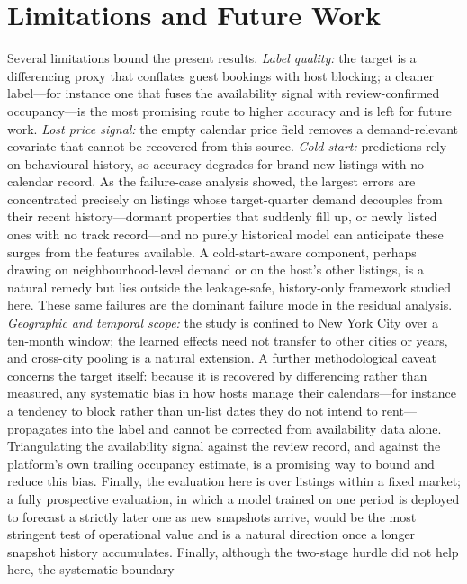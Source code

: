 \documentclass[journal]{IEEEtran}
\begin{document}
\section{Limitations and Future Work}
\label{sec:limits}
Several limitations bound the present results. \emph{Label quality:} the target is
a differencing proxy that conflates guest bookings with host blocking; a cleaner
label---for instance one that fuses the availability signal with review-confirmed
occupancy---is the most promising route to higher accuracy and is left for future
work. \emph{Lost price signal:} the empty calendar price field removes a
demand-relevant covariate that cannot be recovered from this source.
\emph{Cold start:} predictions rely on behavioural history, so accuracy degrades
for brand-new listings with no calendar record. As the failure-case analysis
showed, the largest errors are concentrated precisely on listings whose
target-quarter demand decouples from their recent history---dormant properties that
suddenly fill up, or newly listed ones with no track record---and no purely
historical model can anticipate these surges from the features available. A
cold-start-aware component, perhaps drawing on neighbourhood-level demand or on the
host's other listings, is a natural remedy but lies outside the leakage-safe,
history-only framework studied here. These same failures are the dominant failure
mode in the residual analysis. \emph{Geographic and temporal scope:} the study is
confined to New York City over a ten-month window; the learned effects need not
transfer to other cities or years, and cross-city pooling is a natural extension. A further methodological caveat
concerns the target itself: because it is recovered by differencing rather than
measured, any systematic bias in how hosts manage their calendars---for instance a
tendency to block rather than un-list dates they do not intend to rent---propagates
into the label and cannot be corrected from availability data alone. Triangulating
the availability signal against the review record, and against the platform's own
trailing occupancy estimate, is a promising way to bound and reduce this bias.
Finally, the evaluation here is over listings within a fixed market; a fully
prospective evaluation, in which a model trained on one period is deployed to
forecast a strictly later one as new snapshots arrive, would be the most stringent
test of operational value and is a natural direction once a longer snapshot history
accumulates.
Finally, although the two-stage hurdle did not help here, the systematic boundary
\end{document}

